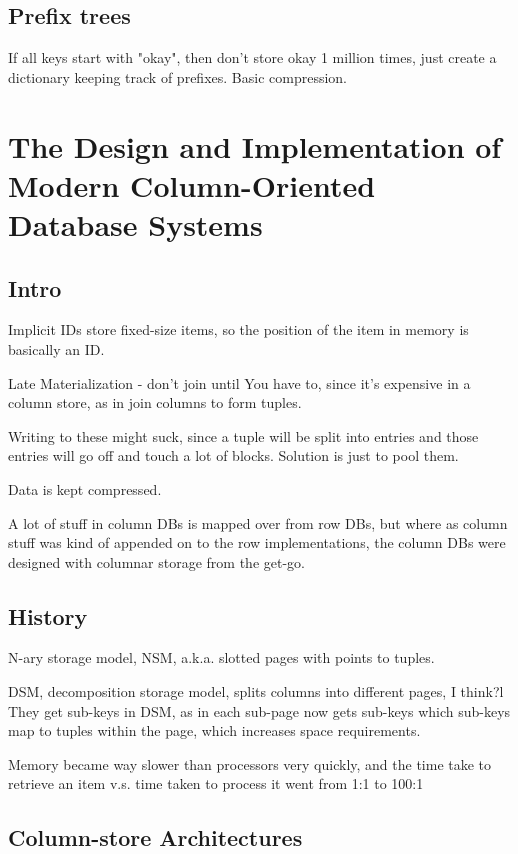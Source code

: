\documentclass{article}
\begin{document}
	\subsection{Prefix trees}
	
		If all keys start with "okay", then don't store okay 1 million  times, just create a dictionary keeping track of prefixes. Basic compression.
		
\newpage
\section{The Design and Implementation of Modern Column-Oriented Database Systems}

	\subsection{Intro}
	
		Implicit IDs store fixed-size items, so the position of the item in memory is basically an ID.
		
		Late Materialization - don't join until You have to, since it's expensive in a column store, as in join columns to form tuples.
		
		Writing to these might suck, since a tuple will be split into entries and those entries will go off and touch a lot of blocks. Solution is just to pool them.
		
		Data is kept compressed.
		
		A lot of stuff in column DBs is mapped over from row DBs, but where as column stuff was kind of appended on to the row implementations, the column DBs were designed with columnar storage from the get-go.
		
	\subsection{History}
	
		N-ary storage model, NSM, a.k.a. slotted pages with points to tuples.
		
		DSM, decomposition storage model, splits columns into different pages, I think?l They get sub-keys in DSM, as in each sub-page now gets sub-keys which sub-keys map to tuples within the page, which increases space requirements.
		
		Memory became way slower than processors very quickly, and the time take to retrieve an item v.s. time taken to process it went from 1:1 to 100:1
	
	\subsection{Column-store Architectures}
	
\end{document}
